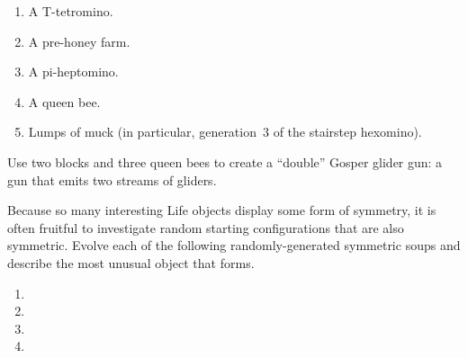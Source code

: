 \begin{multicols}{2}
\begin{problemstar}
		\begin{enumerate}[label=\bf\color{ocre}(\alph*)]
			\item A T-tetromino.
			
			\item A pre-honey farm.
			
			\item A pi-heptomino.
			
			\item A queen bee.
			
			\item Lumps of muck (in particular, generation~$3$ of the stairstep hexomino).
		\end{enumerate}
	\end{problemstar}
	
	
	\mfilbreak
	
	
	\begin{problem}\label{exer:double_gosper_gun} 
		Use two blocks and three queen bees to create a ``double'' Gosper glider gun: a gun that emits two streams of gliders.
	\end{problem}
	
	
	\mfilbreak
	
	
	\begin{problemstar}\label{exer:random_symmetric} 
		Because so many interesting Life objects display some form of symmetry, it is often fruitful to investigate random starting configurations that are also symmetric. Evolve each of the following randomly-generated symmetric soups and describe the most unusual object that forms.\smallskip
		
		\begin{enumerate}[label=\bf\color{ocre}(\alph*)]
			\item {}
			
			\item {}
			
			\item {}
			
			\item {}
		\end{enumerate}
	\end{problemstar}
	

\end{multicols}
